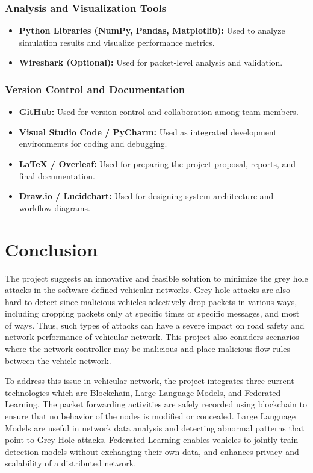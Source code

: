 \documentclass[12pt, a4paper]{report}
\newcommand{\mypar}{\vspace{0.8em}\noindent}
\begin{document}
\subsection{Analysis and Visualization Tools}
\begin{itemize}
    \item \textbf{Python Libraries (NumPy, Pandas, Matplotlib):}
    Used to analyze simulation results and visualize performance metrics.
    \item \textbf{Wireshark (Optional):}
    Used for packet-level analysis and validation.
\end{itemize}

\subsection{Version Control and Documentation}
\begin{itemize}
    \item \textbf{GitHub:}
    Used for version control and collaboration among team members.
    \item \textbf{Visual Studio Code / PyCharm:}
    Used as integrated development environments for coding and debugging.
    \item \textbf{LaTeX / Overleaf:}
    Used for preparing the project proposal, reports, and final documentation.
    \item \textbf{Draw.io / Lucidchart:}
    Used for designing system architecture and workflow diagrams.
\end{itemize}


\chapter{Conclusion}
The project suggests an innovative and feasible solution to minimize the grey hole attacks in the software defined vehicular networks. Grey hole attacks are also hard to detect since malicious vehicles selectively drop packets in various ways, including dropping packets only at specific times or specific messages, and most of ways. Thus, such types of attacks can have a severe impact on road safety and network performance of vehicular network. This project also considers scenarios where the network controller may be malicious and place malicious flow rules between the vehicle network.

\mypar
To address this issue in vehicular network, the project integrates three current technologies which are Blockchain, Large Language Models, and Federated Learning. The packet forwarding activities are safely recorded using blockchain to ensure that no behavior of the nodes is modified or concealed. Large Language Models are useful in network data analysis and detecting abnormal patterns that point to Grey Hole attacks. Federated Learning enables vehicles to jointly train detection models without exchanging their own data, and enhances privacy and scalability of a distributed network.
\end{document}
